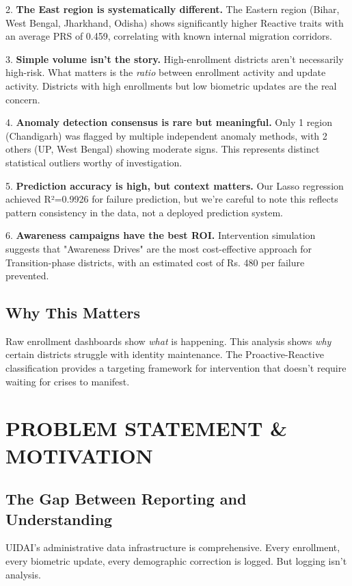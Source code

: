\documentclass[11pt, a4paper]{article}
\begin{document}
2. \textbf{The East region is systematically different.} The Eastern region (Bihar, West Bengal, Jharkhand, Odisha) shows significantly higher Reactive traits with an average PRS of 0.459, correlating with known internal migration corridors.


3. \textbf{Simple volume isn't the story.} High-enrollment districts aren't necessarily high-risk. What matters is the \textit{ratio} between enrollment activity and update activity. Districts with high enrollments but low biometric updates are the real concern.


4. \textbf{Anomaly detection consensus is rare but meaningful.} Only 1 region (Chandigarh) was flagged by multiple independent anomaly methods, with 2 others (UP, West Bengal) showing moderate signs. This represents distinct statistical outliers worthy of investigation.


5. \textbf{Prediction accuracy is high, but context matters.} Our Lasso regression achieved R²=0.9926 for failure prediction, but we're careful to note this reflects pattern consistency in the data, not a deployed prediction system.


6. \textbf{Awareness campaigns have the best ROI.} Intervention simulation suggests that "Awareness Drives" are the most cost-effective approach for Transition-phase districts, with an estimated cost of Rs. 480 per failure prevented.


\subsection{Why This Matters}

Raw enrollment dashboards show \textit{what} is happening. This analysis shows \textit{why} certain districts struggle with identity maintenance. The Proactive-Reactive classification provides a targeting framework for intervention that doesn't require waiting for crises to manifest.




\section{PROBLEM STATEMENT \& MOTIVATION}

\subsection{The Gap Between Reporting and Understanding}

UIDAI's administrative data infrastructure is comprehensive. Every enrollment, every biometric update, every demographic correction is logged. But logging isn't analysis.
\end{document}
